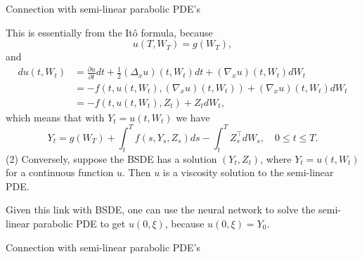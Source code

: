 \documentclass{beamer}
\begin{document}
\begin{frame}{Connection with semi-linear parabolic PDE's}

    {\footnotesize \footnotesize
    This is essentially from the Itô formula, because
    \[
    u(T,W_{T}) = g(W_{T}),
    \]
    and
    \begin{align*}
        du(t,W_{t}) &= \frac{\partial u}{\partial t}dt + \frac{1}{2}(\Delta_{x}u)(t,W_{t})dt + (\nabla_{x}u)(t,W_{t})dW_{t}
        \\ & = -f(t,u(t,W_{t}),(\nabla_{x}u)(t,W_{t})) + (\nabla_{x}u)(t,W_{t})dW_{t}
        \\ &= -f(t,u(t,W_{t}),Z_{t}) + Z_{t}dW_{t},
    \end{align*}
    which means that with \(Y_{t} = u(t,W_{t})\) we have
    \[
    Y_{t} = g(W_{T}) + \int_{t}^{T}f(s,Y_{s},Z_{s})ds - \int_{t}^{T}Z_{s}^{\top}dW_{s}, \quad 0 \leq t \leq T.
    \]
    (2) Conversely, suppose the BSDE has a solution \((Y_{t},Z_{t})\), where $Y_{t} = u(t,W_{t})$
    for a continuous function \(u\). Then \(u\) is a viscosity solution to the 
    semi-linear PDE.
    \vspace{1em}
    \par Given this link with BSDE, one can use the neural network to solve 
    the semi-linear parabolic PDE to get \(u(0,\xi)\), because $u(0,\xi) = Y_{0}.$
    }
    
\end{frame}

\begin{frame}{Connection with semi-linear parabolic PDE's}

    {\footnotesize \footnotesize
     
    }
    
\end{frame}



    
\end{document}
